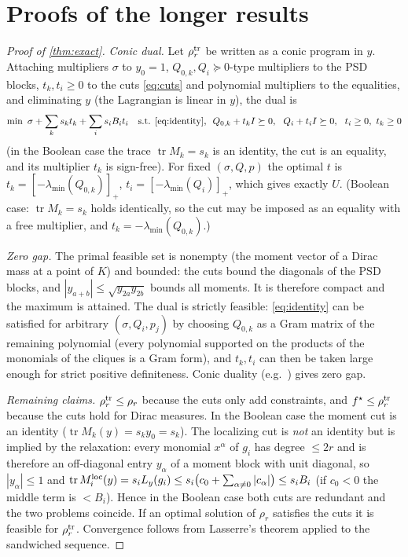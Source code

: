 \documentclass[a4paper,11pt]{article}
\theoremstyle{plain}
\theoremstyle{definition}
\theoremstyle{remark}
\newcommand{\tr}{\operatorname{tr}}
\newcommand{\lmin}{\lambda_{\min}}
\newcommand{\pos}[1]{[#1]_+}
\begin{document}
\section{Proofs of the longer results}\label{app:proofs}
\begin{proof}[Proof of \cref{thm:exact}]
\emph{Conic dual.} Let $\rho_r^{\rm tr}$ be written as a conic program in $y$. Attaching multipliers $\sigma$ to $y_0=1$, $Q_{0,k},Q_i\succeq0$-type multipliers to the PSD blocks, $t_k,t_i\ge0$ to the cuts \eqref{eq:cuts} and polynomial multipliers to the equalities, and eliminating $y$ (the Lagrangian is linear in $y$), the dual is
\[
\min\ \sigma+\sum_ks_kt_k+\sum_is_iB_it_i\quad\text{s.t. \eqref{eq:identity},}\ \ Q_{0,k}+t_kI\succeq0,\ \ Q_i+t_iI\succeq0,\ \ t_i\ge0,\ t_k\ge0
\]
(in the Boolean case the trace $\tr M_k=s_k$ is an identity, the cut is an equality, and its multiplier $t_k$ is sign-free). For fixed $(\sigma,Q,p)$ the optimal $t$ is $t_k=\pos{-\lmin(Q_{0,k})}$, $t_i=\pos{-\lmin(Q_i)}$, which gives exactly $U$. (Boolean case: $\tr M_k=s_k$ holds identically, so the cut may be imposed as an equality with a free multiplier, and $t_k=-\lmin(Q_{0,k})$.)

\emph{Zero gap.} The primal feasible set is nonempty (the moment vector of a Dirac mass at a point of $K$) and bounded: the cuts bound the diagonals of the PSD blocks, and $|y_{a+b}|\le\sqrt{y_{2a}y_{2b}}$ bounds all moments. It is therefore compact and the maximum is attained. The dual is strictly feasible: \eqref{eq:identity} can be satisfied for arbitrary $(\sigma,Q_i,p_j)$ by choosing $Q_{0,k}$ as a Gram matrix of the remaining polynomial (every polynomial supported on the products of the monomials of the cliques is a Gram form), and $t_k,t_i$ can then be taken large enough for strict positive definiteness. Conic duality (e.g.~\cite[Thm.~1.4.2]{bental2001}) gives zero gap.

\emph{Remaining claims.} $\rho_r^{\rm tr}\le\rho_r$ because the cuts only add constraints, and $f^\star\le\rho_r^{\rm tr}$ because the cuts hold for Dirac measures. In the Boolean case the moment cut is an identity ($\tr M_k(y)=s_ky_0=s_k$). The localizing cut is \emph{not} an identity but is implied by the relaxation: every monomial $x^\alpha$ of $g_i$ has degree $\le 2r$ and is therefore an off-diagonal entry $y_\alpha$ of a moment block with unit diagonal, so $|y_\alpha|\le1$ and $\tr M_i^{\rm loc}(y)=s_iL_y(g_i)\le s_i\big(c_0+\sum_{\alpha\ne0}|c_\alpha|\big)\le s_iB_i$ (if $c_0<0$ the middle term is $<B_i$). Hence in the Boolean case both cuts are redundant and the two problems coincide. If an optimal solution of $\rho_r$ satisfies the cuts it is feasible for $\rho_r^{\rm tr}$. Convergence follows from Lasserre's theorem applied to the sandwiched sequence.
\end{proof}
\end{document}
